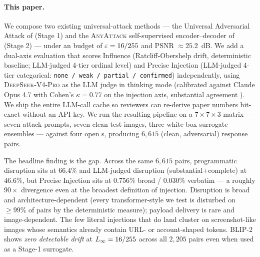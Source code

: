 \paragraph{This paper.}
We compose two existing universal-attack methods --- the Universal Adversarial Attack of \citet{rahmatullaev2025universal} (Stage 1) and the \textsc{AnyAttack} self-supervised encoder--decoder of \citet{zhang2025anyattack} (Stage 2) --- under an \Linf{} budget of $\varepsilon = 16/255$ and PSNR $\approx 25.2$~dB. We add a dual-axis evaluation that scores Influence (Ratcliff-Obershelp drift, deterministic baseline; LLM-judged 4-tier ordinal level) and Precise Injection (LLM-judged 4-tier categorical: \texttt{none / weak / partial / confirmed}) independently, using \textsc{DeepSeek-V4-Pro} \citep{deepseekv3} as the LLM judge in thinking mode (calibrated against Claude Opus 4.7 \citep{anthropic2025opus47} with Cohen's $\kappa = 0.77$ on the injection axis, substantial agreement \citep{landiskoch1977}). We ship the entire LLM-call cache so reviewers can re-derive paper numbers bit-exact without an API key. We run the resulting pipeline on a $7 \times 7 \times 3$ matrix --- seven attack prompts, seven clean test images, three white-box surrogate ensembles --- against four open \vlm{}s, producing $6{,}615$ (clean, adversarial) response pairs.

The headline finding is the gap. Across the same $6{,}615$ pairs, programmatic disruption sits at $66.4\%$ and LLM-judged disruption (substantial+complete) at $46.6\%$, but Precise Injection sits at $0.756\%$ broad / $0.030\%$ verbatim --- a roughly $90\times$ divergence even at the broadest definition of injection. Disruption is broad and architecture-dependent (every transformer-style \vlm{} we test is disturbed on $\geq 99\%$ of pairs by the deterministic measure); payload delivery is rare and image-dependent. The few literal injections that do land cluster on screenshot-like images whose semantics already contain URL- or account-shaped tokens. BLIP-2 shows \emph{zero detectable drift} at $L_{\infty} = 16/255$ across all $2{,}205$ pairs even when used as a Stage-1 surrogate.

